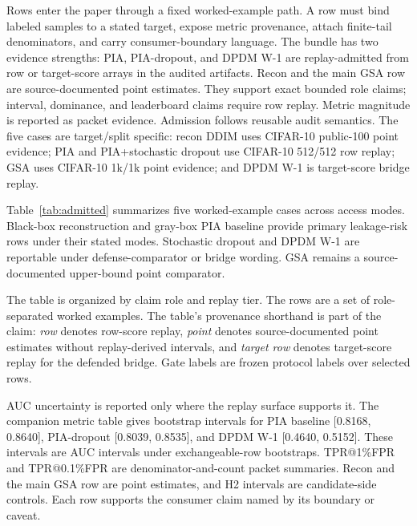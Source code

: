 \documentclass[10pt,conference]{IEEEtran}
\begin{document}
Rows enter the paper through a fixed worked-example path. A row must
bind labeled samples to a stated target, expose metric provenance, attach
finite-tail denominators, and carry consumer-boundary language. The bundle has
two evidence strengths: PIA, PIA-dropout, and DPDM W-1 are replay-admitted from
row or target-score arrays in the audited artifacts. Recon and the main GSA row
are source-documented point estimates. They support exact bounded role claims;
interval, dominance, and leaderboard claims require row replay. Metric magnitude
is reported as packet evidence. Admission follows reusable audit semantics.
The five cases are target/split specific: recon DDIM uses CIFAR-10 public-100
point evidence; PIA and PIA+stochastic dropout use CIFAR-10 512/512 row replay;
GSA uses CIFAR-10 1k/1k point evidence; and DPDM W-1 is target-score bridge
replay.

Table~\ref{tab:admitted} summarizes five worked-example cases across access
modes. Black-box reconstruction and gray-box PIA baseline provide primary
leakage-risk rows under their stated modes. Stochastic dropout and DPDM W-1 are
reportable under defense-comparator or bridge wording. GSA remains a
source-documented upper-bound point comparator.

The table is organized by claim role and replay tier. The rows are a set of
role-separated worked examples. The table's
provenance shorthand is part of the claim: \emph{row} denotes row-score replay,
\emph{point} denotes source-documented point estimates without replay-derived
intervals, and \emph{target row} denotes target-score replay for the defended
bridge. Gate labels are frozen protocol labels over selected rows.

AUC uncertainty is reported only where the replay surface supports it. The
companion metric table gives bootstrap intervals for PIA baseline [0.8168,
0.8640], PIA-dropout [0.8039, 0.8535], and DPDM W-1 [0.4640, 0.5152]. These
intervals are AUC intervals under exchangeable-row bootstraps. TPR@1\%FPR and
TPR@0.1\%FPR are denominator-and-count packet summaries. Recon and the main GSA
row are point estimates, and H2 intervals are candidate-side controls. Each row
supports the consumer claim named by its boundary or caveat.
\end{document}
